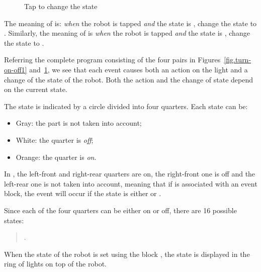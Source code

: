 \begin{figure}
\begin{center}
\caption{Tap to change the state}\label{fig.turn-on-off2}
\end{center}
\end{figure}

The meaning of  is: \emph{when} the robot is tapped
\emph{and} the state is , change the state to .
Similarly, the meaning of  is \emph{when} the robot
is tapped \emph{and} the state is , change the state to .

Referring the complete program consisting of the four pairs in
Figures~\ref{fig.turn-on-off1} and~\ref{fig.turn-on-off2}, we see that
each event causes both an action on the light and a change of the state
of the robot. Both the action and the change of state depend on the
current state.


The state is indicated by a circle divided into four quarters. Each state can be:
\begin{itemize}
\item Gray: the part is not taken into account;
\item White: the quarter is \emph{off};
\item Orange: the quarter is \emph{on}.
\end{itemize}

In , the left-front and right-rear quarters are on, the
right-front one is off and the left-rear one is not taken into account,
meaning that if  is associated with an event block, the
event will occur if the state is either  or .

Since each of the four quarters can be either on or off, there are 16
possible states:
\begin{quote}
.
\end{quote}

When the state of the robot is set using the block ,
the state is displayed in the ring of lights on top of the robot.

